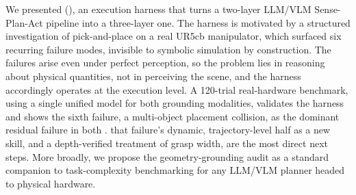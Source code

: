 We presented \harness{} (\harnesslong{}), an execution harness
that turns a two-layer LLM/VLM Sense-Plan-Act pipeline into a
three-layer one.  The harness is
motivated by a structured investigation of pick-and-place on a real
UR5cb manipulator, which surfaced six recurring failure modes,
invisible to symbolic simulation by construction. The failures arise
even under perfect perception, so the problem lies in reasoning about
physical quantities, not in perceiving the scene, and the harness
accordingly operates at the execution level.  A 120-trial
real-hardware benchmark, using a single unified model for both
grounding modalities, validates the harness and shows the sixth
failure, a multi-object placement collision, as the dominant residual
failure in both .  that failure's
dynamic, trajectory-level half as a new skill, and a depth-verified
treatment of grasp width, are the most direct next steps. More
broadly, we propose the geometry-grounding audit as a standard
companion to task-complexity benchmarking for any LLM/VLM planner
headed to physical hardware.
